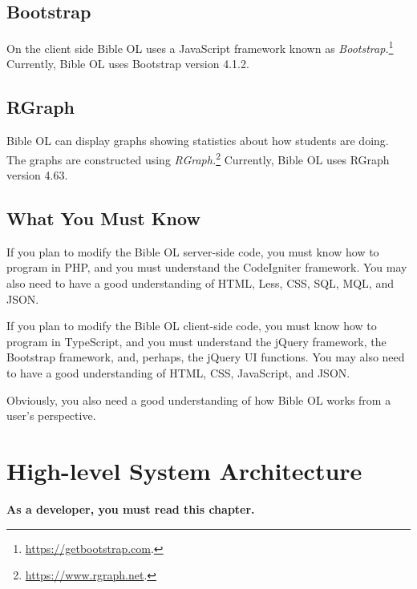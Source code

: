 \documentclass[11pt,oneside,a4paper]{memoir}
\begin{document}
\section{Bootstrap}

On the client side Bible OL uses a JavaScript framework known as
\emph{Bootstrap.}\footnote{\url{https://getbootstrap.com}.} Currently, Bible OL uses Bootstrap
version 4.1.2.

\section{RGraph}

Bible OL can display graphs showing statistics about how students are doing. The graphs are
constructed using \emph{RGraph.}\footnote{\url{https://www.rgraph.net}.} Currently, Bible OL uses
RGraph version 4.63.


\section{What You Must Know}

If you plan to modify the Bible OL server-side code, you must know how to program in PHP, and you
must understand the CodeIgniter framework. You may also need to have a good understanding of HTML,
Less, CSS, SQL, MQL, and JSON.

If you plan to modify the Bible OL client-side code, you must know how to program in TypeScript, and
you must understand the jQuery framework, the Bootstrap framework, and, perhaps, the jQuery UI
functions. You may also need to have a good understanding of HTML, CSS, JavaScript, and JSON.

Obviously, you also need a good understanding of how Bible OL works from a user's perspective.


\chapter{High-level System Architecture}

\textbf{As a developer, you must read this chapter.}
\end{document}
